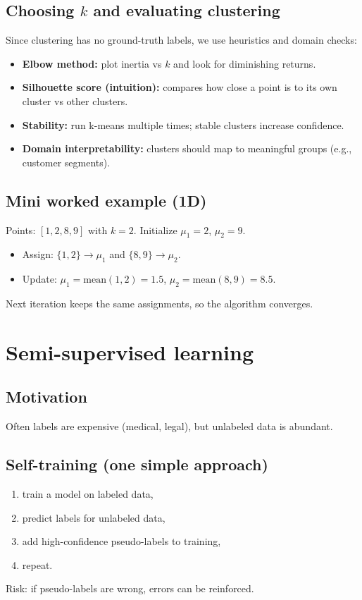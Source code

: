 \documentclass[11pt]{article}
\begin{document}
\subsection{Choosing $k$ and evaluating clustering}
Since clustering has no ground-truth labels, we use heuristics and domain checks:
\begin{itemize}[leftmargin=*]
  \item \textbf{Elbow method:} plot inertia vs $k$ and look for diminishing returns.
  \item \textbf{Silhouette score (intuition):} compares how close a point is to its own cluster vs other clusters.
  \item \textbf{Stability:} run k-means multiple times; stable clusters increase confidence.
  \item \textbf{Domain interpretability:} clusters should map to meaningful groups (e.g., customer segments).
\end{itemize}

\subsection{Mini worked example (1D)}
Points: $[1,2,8,9]$ with $k=2$.
Initialize $\mu_1=2$, $\mu_2=9$.
\begin{itemize}[leftmargin=*]
  \item Assign: $\{1,2\}\rightarrow \mu_1$ and $\{8,9\}\rightarrow \mu_2$.
  \item Update: $\mu_1=\text{mean}(1,2)=1.5$, $\mu_2=\text{mean}(8,9)=8.5$.
\end{itemize}
Next iteration keeps the same assignments, so the algorithm converges.

\section{Semi-supervised learning}
\subsection{Motivation}
Often labels are expensive (medical, legal), but unlabeled data is abundant.

\subsection{Self-training (one simple approach)}
\begin{enumerate}[leftmargin=*]
  \item train a model on labeled data,
  \item predict labels for unlabeled data,
  \item add high-confidence pseudo-labels to training,
  \item repeat.
\end{enumerate}
Risk: if pseudo-labels are wrong, errors can be reinforced.
\end{document}
